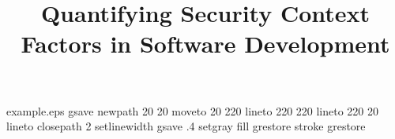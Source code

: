 %
%
%
%
%
\begin{filecontents*}{example.eps}
gsave
newpath
  20 20 moveto
  20 220 lineto
  220 220 lineto
  220 20 lineto
closepath
2 setlinewidth
gsave
  .4 setgray fill
grestore
stroke
grestore
\end{filecontents*}
%
\RequirePackage{fix-cm}
%
\documentclass[smallextended]{svjour3}       %
%
\smartqed  %
%

\usepackage{amsmath}
\usepackage{wasysym}
\usepackage{tikz}

\usepackage{url}
\usepackage{graphicx}
\usepackage{alltt}
\usepackage{algorithm}

\usepackage{algorithmic}
\usepackage{cite}
\usepackage{flushend}
\usepackage{tabularx}
\usepackage{framed}
\usepackage{subcaption}
\captionsetup{compatibility=false}

%


%
%
%
%
%


\title{Quantifying Security Context Factors in Software Development}

